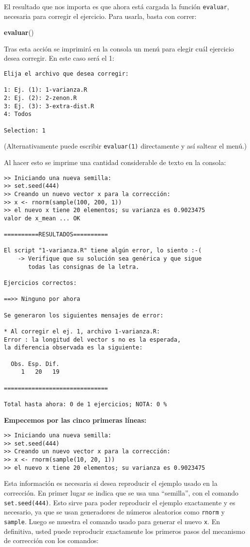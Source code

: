 \documentclass[]{article}
\newenvironment{Shaded}{}{}
\newcommand{\KeywordTok}[1]{\textcolor[rgb]{0.00,0.44,0.13}{\textbf{{#1}}}}
\newcommand{\NormalTok}[1]{{#1}}
\begin{document}
El resultado que nos importa es que ahora está cargada la función
\texttt{evaluar}, necesaria para corregir el ejercicio. Para usarla,
basta con correr:

\begin{Shaded}
\begin{Highlighting}[]
\KeywordTok{evaluar}\NormalTok{()}
\end{Highlighting}
\end{Shaded}
Tras esta acción se imprimirá en la consola un menú para elegir cuál
ejercicio desea corregir. En este caso será el 1:

\begin{verbatim}
Elija el archivo que desea corregir: 

1: Ej. (1): 1-varianza.R
2: Ej. (2): 2-zenon.R
3: Ej. (3): 3-extra-dist.R
4: Todos

Selection: 1
\end{verbatim}
(Alternativamente puede escribir \texttt{evaluar(1)} directamente y así
saltear el menú.)

Al hacer esto se imprime una cantidad considerable de texto en la
consola:

\begin{verbatim}
>> Iniciando una nueva semilla:
>> set.seed(444)
>> Creando un nuevo vector x para la corrección:
>> x <- rnorm(sample(100, 200, 1))
>> el nuevo x tiene 20 elementos; su varianza es 0.9023475
valor de x_mean ... OK

==========RESULTADOS==========

El script "1-varianza.R" tiene algún error, lo siento :-(
    -> Verifique que su solución sea genérica y que sigue
       todas las consignas de la letra. 

Ejercicios correctos:

==>> Ninguno por ahora

Se generaron los siguientes mensajes de error:

* Al corregir el ej. 1, archivo 1-varianza.R:
Error : la longitud del vector s no es la esperada,
la diferencia observada es la siguiente:

  Obs. Esp. Dif. 
     1   20   19 

==============================

Total hasta ahora: 0 de 1 ejercicios; NOTA: 0 % 
\end{verbatim}
\textbf{Empecemos por las cinco primeras líneas:}

\begin{verbatim}
>> Iniciando una nueva semilla:
>> set.seed(444)
>> Creando un nuevo vector x para la corrección:
>> x <- rnorm(sample(10, 20, 1))
>> el nuevo x tiene 20 elementos; su varianza es 0.9023475
\end{verbatim}
Esta información es necesaria si desea reproducir el ejemplo usado en la
corrección. En primer lugar se indica que se usa una ``semilla'', con el
comando \texttt{set.seed(444)}. Esto sirve para poder reproducir el
ejemplo exactamente y es necesario, ya que se usan generadores de
números aleatorios como \texttt{rnorm} y \texttt{sample}. Luego se
muestra el comando usado para generar el nuevo \texttt{x}. En
definitiva, usted puede reproducir exactamente los primeros pasos del
mecanismo de corrección con los comandos:
\end{document}
